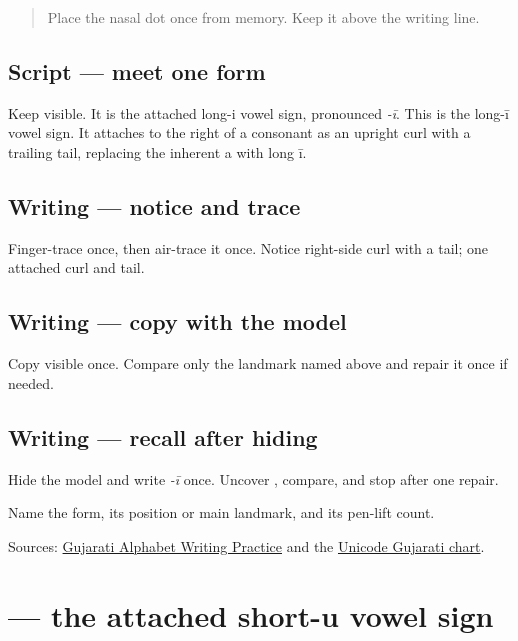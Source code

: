 \label{lesson:GU-W03-ii-matra}



\begin{quote}
Place the nasal dot once from memory. Keep it above the writing line.
\end{quote}

\subsection*{Script — meet one form}
Keep \textbf{} visible. It is the attached long-i vowel sign, pronounced \emph{-ī}. This is the long-ī vowel sign. It attaches to the right of a consonant as an upright curl with a trailing tail, replacing the inherent a with long ī.

\subsection*{Writing — notice and trace}

Finger-trace \textbf{} once, then air-trace it once. Notice right-side curl with a tail; one attached curl and tail.

\subsection*{Writing — copy with the model}
Copy visible \textbf{} once. Compare only the landmark named above and repair it once if needed.

\subsection*{Writing — recall after hiding}
Hide the model and write \emph{-ī} once. Uncover \textbf{}, compare, and stop after one repair.

\begin{tcolorbox}[breakable,colback=teal!4,colframe=teal!35!black,title={Before you move on}]
Name the form, its position or main landmark, and its pen-lift count.

Sources: \href{https://www.t30apps.com/gujarati-alphabet-writing/}{Gujarati Alphabet Writing Practice} and the \href{https://www.unicode.org/charts/PDF/U0A80.pdf}{Unicode Gujarati chart}.
\end{tcolorbox}
\section[\texorpdfstring{\gu{ુ} (-u)}{ુ (-u)}]{ — the attached short-u vowel sign}

